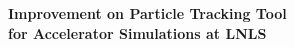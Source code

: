 \documentclass[preview]{standalone}
\begin{document}
\begin{center}
\centering \textbf{Improvement on Particle Tracking Tool\\ for Accelerator Simulations at LNLS}
\end{center}
\end{document}
